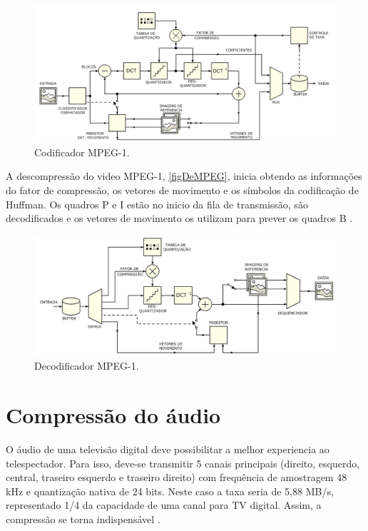 \begin{figure}[htb]
	\caption{\label{figMPEG} Codificador MPEG-1.}
	\begin{center}
		\includegraphics[width=\ScaleIfNeeded]{figMPEG.png}
	\end{center}
\end{figure}


A descompressão do video MPEG-1, \autoref{figDeMPEG}, inicia obtendo as informações do fator de compressão, os vetores de movimento e os símbolos da codificação de Huffman. Os quadros P e I estão no inicio da fila de transmissão, são decodificados e os vetores de movimento os utilizam para prever os quadros B \cite{tvDigitalUSP}.

\begin{figure}[htb]
	\caption{\label{figDeMPEG} Decodificador MPEG-1.}
	\begin{center}
		\includegraphics[width=\ScaleIfNeeded]{figDeMPEG.png}
	\end{center}
\end{figure}

\section{Compressão do áudio}

O áudio de uma televisão digital deve possibilitar a melhor experiencia ao telespectador. Para isso, deve-se transmitir 5 canais principais (direito, esquerdo, central, traseiro esquerdo e traseiro direito) com frequência de amostragem 48 kHz e quantização nativa de 24 bits. Neste caso a taxa seria de 5,88 MB/s, representado 1/4 da capacidade de uma canal para TV digital. Assim, a compressão se torna indispensável \cite{tvDigitalUSP}. 

